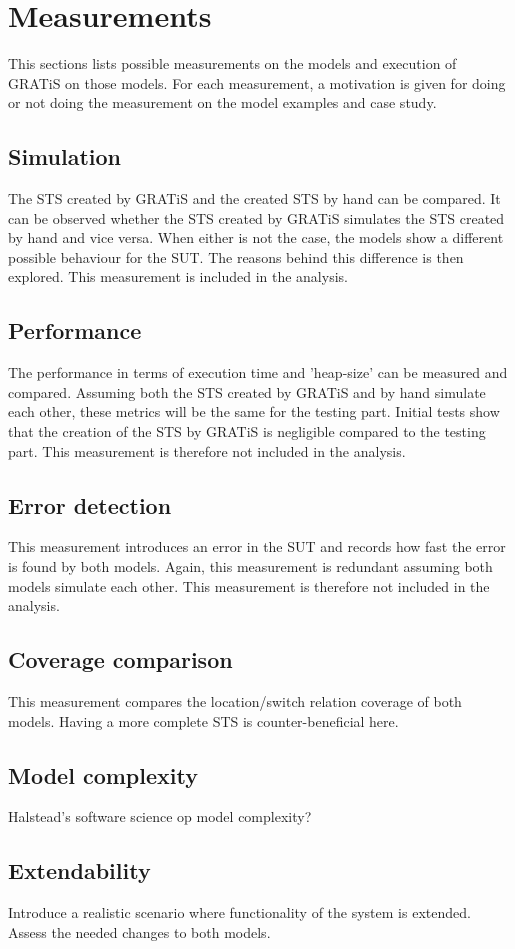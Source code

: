 \section{Measurements}\label{sec:measurements}

This sections lists possible measurements on the models and execution of GRATiS on those models. For each measurement, a motivation is given for doing or not doing the measurement on the model examples and case study.

\subsection{Simulation}
The STS created by GRATiS and the created STS by hand can be compared. It can be observed whether the STS created by GRATiS simulates the STS created by hand and vice versa. When either is not the case, the models show a different possible behaviour for the SUT. The reasons behind this difference is then explored. This measurement is included in the analysis.

\subsection{Performance}
The performance in terms of execution time and 'heap-size' can be measured and compared. Assuming both the STS created by GRATiS and by hand simulate each other, these metrics will be the same for the testing part. Initial tests show that the creation of the STS by GRATiS is negligible compared to the testing part. This measurement is therefore not included in the analysis.

\subsection{Error detection}
This measurement introduces an error in the SUT and records how fast the error is found by both models. Again, this measurement is redundant assuming both models simulate each other. This measurement is therefore not included in the analysis.

\subsection{Coverage comparison}
This measurement compares the location/switch relation coverage of both models. Having a more complete STS is counter-beneficial here.

\subsection{Model complexity}
Halstead's software science op model complexity?

\subsection{Extendability}
Introduce a realistic scenario where functionality of the system is extended. Assess the needed changes to both models.
